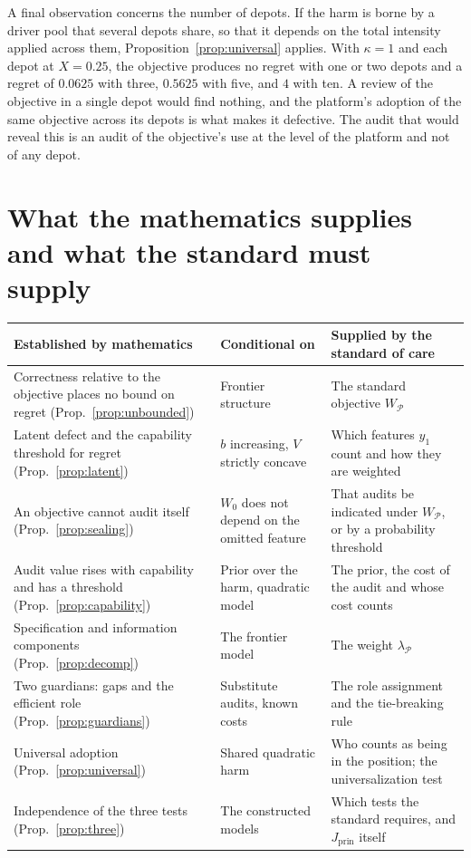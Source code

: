 \documentclass[11pt]{article}
\theoremstyle{plain}
\theoremstyle{definition}
\begin{document}
A final observation concerns the number of depots. If the harm is borne by a driver pool that several depots share, so that it depends on the total intensity applied across them, Proposition~\ref{prop:universal} applies. With $\kappa=1$ and each depot at $X=0.25$, the objective produces no regret with one or two depots and a regret of $0.0625$ with three, $0.5625$ with five, and $4$ with ten. A review of the objective in a single depot would find nothing, and the platform's adoption of the same objective across its depots is what makes it defective. The audit that would reveal this is an audit of the objective's use at the level of the platform and not of any depot.

\section{What the mathematics supplies and what the standard must supply}\label{sec:supply}

\begin{center}
\small
\begin{tabular}{@{}p{}p{}p{}@{}}
\hline
Established by mathematics & Conditional on & Supplied by the standard of care\\
\hline
Correctness relative to the objective places no bound on regret (Prop.~\ref{prop:unbounded}) & Frontier structure & The standard objective $W_{\mathcal P}$\\
Latent defect and the capability threshold for regret (Prop.~\ref{prop:latent}) & $b$ increasing, $V$ strictly concave & Which features $y_1$ count and how they are weighted\\
An objective cannot audit itself (Prop.~\ref{prop:sealing}) & $W_0$ does not depend on the omitted feature & That audits be indicated under $W_{\mathcal P}$, or by a probability threshold\\
Audit value rises with capability and has a threshold (Prop.~\ref{prop:capability}) & Prior over the harm, quadratic model & The prior, the cost of the audit and whose cost counts\\
Specification and information components (Prop.~\ref{prop:decomp}) & The frontier model & The weight $\lambda_{\mathcal P}$\\
Two guardians: gaps and the efficient role (Prop.~\ref{prop:guardians}) & Substitute audits, known costs & The role assignment and the tie-breaking rule\\
Universal adoption (Prop.~\ref{prop:universal}) & Shared quadratic harm & Who counts as being in the position; the universalization test\\
Independence of the three tests (Prop.~\ref{prop:three}) & The constructed models & Which tests the standard requires, and $J_{\mathrm{prin}}$ itself\\
\hline
\end{tabular}
\end{center}
\end{document}
